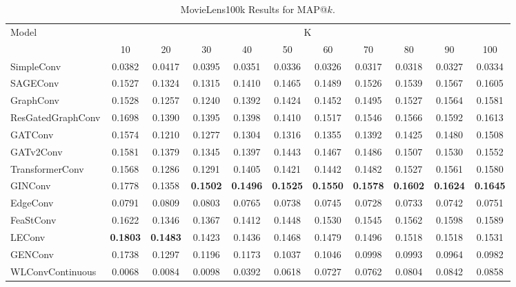 \documentclass[bst/sn-nature]{sn-jnl}
\begin{document}
\begin{appendices}
\begin{table}[htbp]
    \centering 
    \begin{tabular}{|l|*{10}{c|}}
    \hline
    \multirow{2}{*}{Model} & \multicolumn{10}{c|}{K} \\
    \hhline{~*{10}{|-}|}
                             & 10    & 20    & 30    & 40    & 50    & 60    & 70    & 80    & 90    & 100   \\ \hline
    \rowcolor[gray]{0.9} SimpleConv               & 0.0382 & 0.0417 & 0.0395 & 0.0351 & 0.0336 & 0.0326 & 0.0317 & 0.0318 & 0.0327 & 0.0334 \\ 
    SAGEConv                 & 0.1527 & 0.1324 & 0.1315 & 0.1410 & 0.1465 & 0.1489 & 0.1526 & 0.1539 & 0.1567 & 0.1605 \\ 
    \rowcolor[gray]{0.9} GraphConv                & 0.1528 & 0.1257 & 0.1240 & 0.1392 & 0.1424 & 0.1452 & 0.1495 & 0.1527 & 0.1564 & 0.1581 \\ 
    ResGatedGraphConv        & 0.1698 & 0.1390 & 0.1395 & 0.1398 & 0.1410 & 0.1517 & 0.1546 & 0.1566 & 0.1592 & 0.1613 \\ 
    \rowcolor[gray]{0.9} GATConv                  & 0.1574 & 0.1210 & 0.1277 & 0.1304 & 0.1316 & 0.1355 & 0.1392 & 0.1425 & 0.1480 & 0.1508 \\ 
    GATv2Conv                & 0.1581 & 0.1379 & 0.1345 & 0.1397 & 0.1443 & 0.1467 & 0.1486 & 0.1507 & 0.1530 & 0.1552 \\ 
    \rowcolor[gray]{0.9} TransformerConv          & 0.1568 & 0.1286 & 0.1291 & 0.1405 & 0.1421 & 0.1442 & 0.1482 & 0.1527 & 0.1561 & 0.1580 \\ 
    GINConv                  & 0.1778 & 0.1358 & \textbf{0.1502} & \textbf{0.1496} & \textbf{0.1525} & \textbf{0.1550} & \textbf{0.1578} & \textbf{0.1602} & \textbf{0.1624} & \textbf{0.1645} \\ 
    \rowcolor[gray]{0.9} EdgeConv                 & 0.0791 & 0.0809 & 0.0803 & 0.0765 & 0.0738 & 0.0745 & 0.0728 & 0.0733 & 0.0742 & 0.0751 \\ 
    FeaStConv                & 0.1622 & 0.1346 & 0.1367 & 0.1412 & 0.1448 & 0.1530 & 0.1545 & 0.1562 & 0.1598 & 0.1589 \\ 
    \rowcolor[gray]{0.9} LEConv                   & \textbf{0.1803} & \textbf{0.1483} & 0.1423 & 0.1436 & 0.1468 & 0.1479 & 0.1496 & 0.1518 & 0.1518 & 0.1531 \\ 
    GENConv                  & 0.1738 & 0.1297 & 0.1196 & 0.1173 & 0.1037 & 0.1046 & 0.0998 & 0.0993 & 0.0964 & 0.0982 \\ 
    \rowcolor[gray]{0.9} WLConvContinuous         & 0.0068 & 0.0084 & 0.0098 & 0.0392 & 0.0618 & 0.0727 & 0.0762 & 0.0804 & 0.0842 & 0.0858 \\ \hline
    \end{tabular}
    \caption{MovieLens100k Results for MAP@$k$.}
    \label{tab:map}
\end{table}


\end{appendices}
\end{document}
